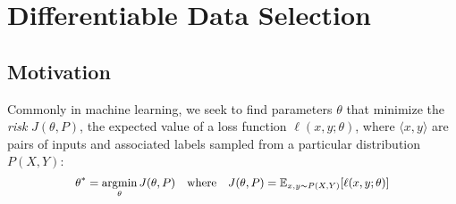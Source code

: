 \section{\label{sec:method}Differentiable Data Selection}
\subsection{\label{sec:dds_motivation}Motivation}


Commonly in machine learning, we seek to find parameters $\theta$ that minimize the \emph{risk} $J(\theta,P)$, the expected value of a loss function $\ell(x, y; \theta)$,
where $\langle x, y \rangle$ are pairs of inputs and associated labels sampled from a particular distribution $P(X, Y)$:
\begin{equation}
  \label{eqn:generic_optim}
   \small
  \begin{aligned}
    \theta^* = \argmin_\theta J(\theta, P)
    ~~~\text{where}~~~
    J(\theta, P) = \mathbb{E}_{x, y \sim P(X, Y)} [\ell(x, y; \theta)]
  \end{aligned}
\end{equation}

